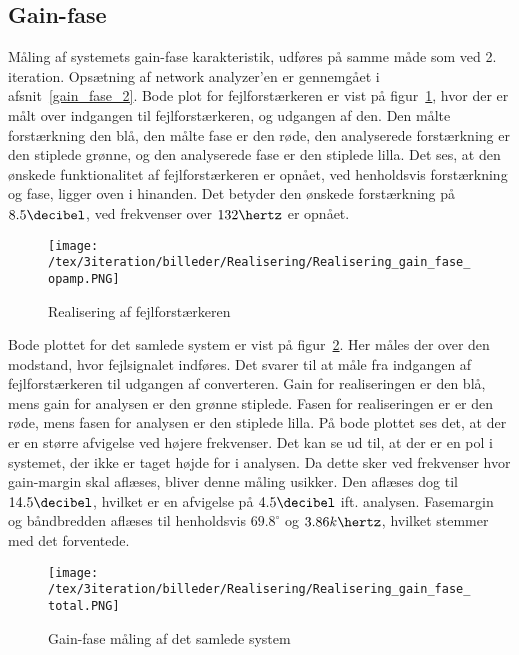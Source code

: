 
\subsection{Gain-fase}
Måling af systemets gain-fase karakteristik, udføres på samme måde som ved 2. iteration. Opsætning af network analyzer'en er gennemgået i afsnit~\ref{gain_fase_2}. Bode plot for fejlforstærkeren er vist på figur~\ref{fig:Realisering_error_op_amp_3}, hvor der er målt over indgangen til fejlforstærkeren, og udgangen af den. Den målte forstærkning den blå, den målte fase er den røde, den analyserede forstærkning er den stiplede grønne, og den analyserede fase er den stiplede lilla. Det ses, at den ønskede funktionalitet af fejlforstærkeren er opnået, ved henholdsvis forstærkning og fase, ligger oven i hinanden. Det betyder den ønskede forstærkning på $8.5\decibel$, ved frekvenser over $132\hertz$ er opnået. 

\begin{figure}[H]
	\center
	\texttt{[image: /tex/3iteration/billeder/Realisering/Realisering\_gain\_fase\_opamp.PNG]}
	\caption{Realisering af fejlforstærkeren}
	\label{fig:Realisering_error_op_amp_3}
\end{figure}

Bode plottet for det samlede system er vist på figur~\ref{fig:Realisering_total_3}. Her måles der over den modstand, hvor fejlsignalet indføres. Det svarer til at måle fra indgangen af fejlforstærkeren til udgangen af converteren. Gain for realiseringen er den blå, mens gain for analysen er den grønne stiplede. Fasen for realiseringen er er den røde, mens fasen for analysen er den stiplede lilla. På bode plottet ses det, at der er en større afvigelse ved højere frekvenser. Det kan se ud til, at der er en pol i systemet, der ikke er taget højde for i analysen. Da dette sker ved frekvenser hvor gain-margin skal aflæses, bliver denne måling usikker. Den aflæses dog til $14.5\decibel$, hvilket er en afvigelse på $4.5\decibel$ ift. analysen. Fasemargin og båndbredden aflæses til henholdsvis $69.8^\circ$ og $3.86k\hertz$, hvilket stemmer med det forventede. 

\begin{figure}[H]
	\center
	\texttt{[image: /tex/3iteration/billeder/Realisering/Realisering\_gain\_fase\_total.PNG]}
	\caption{Gain-fase måling af det samlede system}
	\label{fig:Realisering_total_3}
\end{figure}

